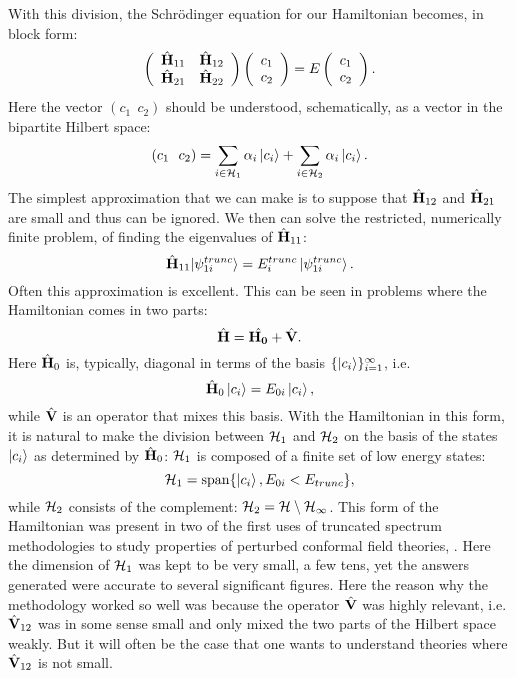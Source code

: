 \documentclass[twocolumn,secnumarabic,amssymb, nobibnotes, aps, prd]{revtex4-2}
\newcommand{\Hll}{\hat{\bf H}_{11}}
\newcommand{\Hhh}{\hat{\bf H}_{22}}
\newcommand{\Hhl}{\hat{\bf H}_{21}}
\newcommand{\Hlh}{\hat{\bf H}_{12}}
\newcommand{\Vlh}{\hat{\bf V}_{12}}
\begin{document}
With this division, the Schr\"odinger equation for our Hamiltonian becomes, in block form:
\begin{equation}
    \left(
    \begin{array}{cc}
        \Hll & \Hlh \\
        \Hhl & \Hhh
    \end{array}
    \right)
    \left(
    \begin{array}{c}
    c_{1} \\
    c_{2}
    \end{array}
    \right) = E
    \left(
    \begin{array}{c}
    c_{1} \\
    c_{2}
    \end{array}
    \right)\label{HmatDSum}.
\end{equation}
Here the vector $(c_{1}~~c_{2})$ should be understood, schematically, as a vector in the bipartite Hilbert space:
\begin{equation}
    (c_{1}~~ c_{2}) = \sum_{i\in{\cal H}_1}\alpha_i \ket{c_i} +\sum_{i\in{\cal H}_2}\alpha_i \ket{c_i}.
\end{equation}
The simplest approximation that we can make is to suppose that $\Hlh$ and $\Hhl$ are small and thus can be ignored.  We then can solve the restricted, numerically finite problem, of finding the eigenvalues of $\Hll$:
\begin{equation}
    \Hll|\psi^{trunc}_{1i}\rangle = E^{trunc}_i\ket{\psi^{trunc}_{1i}}.
\end{equation}
Often this approximation is excellent.  This can be seen in problems where the Hamiltonian comes in two parts:
\begin{equation}\label{Ham_HV}
    \hat {\bf H} = \hat{\bf H_0} + \hat{\bf V}.
\end{equation}
Here $\hat {\bf H}_0$ is, typically, diagonal in terms of the basis $\{\ket{c_i}\}^\infty_{i=1}$, i.e.
\begin{equation}
    \hat {\bf H}_0\ket{c_i} = E_{0i}\ket{c_i},
\end{equation}
while $\hat {\bf V}$ is an operator that mixes this basis.  With the Hamiltonian in this form, it is natural to make the division between ${\cal H}_1$ and ${\cal  H}_2$ on the basis of the states $\ket{c_i}$ as determined by $\hat {\bf H}_0$: ${\cal H}_1$ is composed of a finite set of low energy states:
\begin{equation}
    {\cal H}_1 = {\rm span}\{\ket{c_i},E_{0i}<E_{trunc}\},
\end{equation}
while ${\cal H}_2$ consists of the complement: ${\cal H}_2=\cal H\setminus {\cal H}_1$.
This form of the Hamiltonian was present in two of the first uses of truncated spectrum methodologies to study properties of perturbed conformal field theories, \cite{yurov1990truncated,yurov1991truncated}.  Here the dimension of ${\cal H}_1$ was kept to be very small, a few tens, yet the answers generated were accurate to several significant figures.  Here the reason why the methodology worked so well was because the operator $\hat {\bf V}$ was highly relevant, i.e. $\Vlh$ was in some sense small and only mixed the two parts of the Hilbert space weakly.  But it will often be the case that one wants to understand theories where $\Vlh$ is not small.
\end{document}
